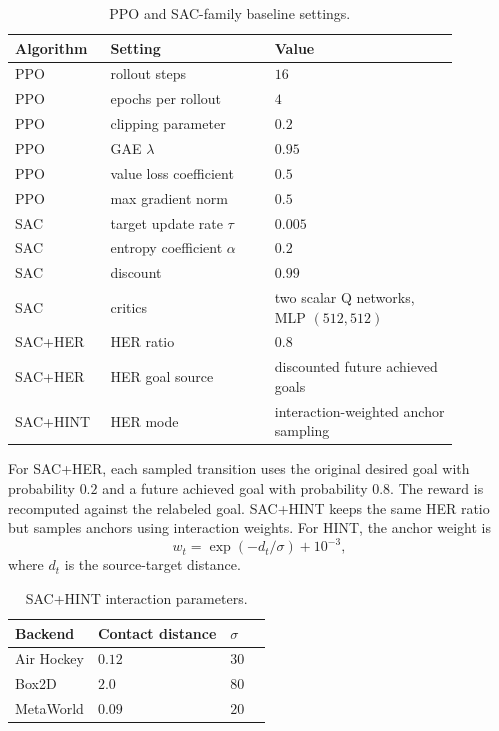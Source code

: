 \begin{table}[h]
\centering
\small
\setlength{\tabcolsep}{5pt}
\caption{PPO and SAC-family baseline settings.}
\label{tab:appendix-baseline-settings}
\begin{tabular}{p{0.16\linewidth}p{0.34\linewidth}p{0.38\linewidth}}
\toprule
Algorithm & Setting & Value \\
\midrule
PPO & rollout steps & $16$ \\
PPO & epochs per rollout & $4$ \\
PPO & clipping parameter & $0.2$ \\
PPO & GAE $\lambda$ & $0.95$ \\
PPO & value loss coefficient & $0.5$ \\
PPO & max gradient norm & $0.5$ \\
\midrule
SAC & target update rate $\tau$ & $0.005$ \\
SAC & entropy coefficient $\alpha$ & $0.2$ \\
SAC & discount & $0.99$ \\
SAC & critics & two scalar Q networks, MLP $(512,512)$ \\
SAC+HER & HER ratio & $0.8$ \\
SAC+HER & HER goal source & discounted future achieved goals \\
SAC+HINT & HER mode & interaction-weighted anchor sampling \\
\bottomrule
\end{tabular}
\end{table}

For SAC+HER, each sampled transition uses the original desired goal with
probability $0.2$ and a future achieved goal with probability $0.8$.  The
reward is recomputed against the relabeled goal.  SAC+HINT keeps the same HER
ratio but samples anchors using interaction weights.  For HINT, the anchor
weight is
\[
    w_t = \exp(-d_t/\sigma) + 10^{-3},
\]
where $d_t$ is the source-target distance.

\begin{table}[h]
\centering
\small
\setlength{\tabcolsep}{5pt}
\caption{SAC+HINT interaction parameters.}
\label{tab:appendix-sac-hint-params}
\begin{tabular}{llll}
\toprule
Backend & Contact distance & $\sigma$ \\
\midrule
Air Hockey & $0.12$ & $30$ \\
Box2D & $2.0$ & $80$ \\
MetaWorld & $0.09$ & $20$ \\
\bottomrule
\end{tabular}
\end{table}

